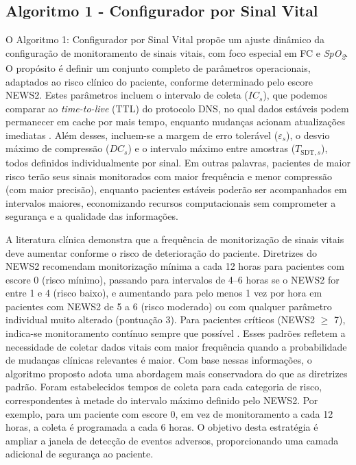 \documentclass[twoside,english,brazilian]{UNISINOSmonografia}
\begin{document}
\subsection{Algoritmo 1 - Configurador por Sinal Vital}
\label{alg1}
O Algoritmo 1: Configurador por Sinal Vital propõe um ajuste dinâmico da configuração de monitoramento de sinais vitais, com foco especial em FC e \textit{SpO\textsubscript{2}}. O propósito é definir um conjunto completo de parâmetros operacionais, adaptados ao risco clínico do paciente, conforme determinado pelo escore NEWS2. Estes parâmetros incluem o intervalo de coleta ($IC_s$), que podemos comparar ao \textit{time-to-live} (TTL) do protocolo DNS, no qual dados estáveis podem permanecer em cache por mais tempo, enquanto mudanças acionam atualizações imediatas \cite{Tanenbaum2010}.
Além desses, incluem-se a margem de erro tolerável ($\varepsilon_s$), o desvio máximo de compressão ($DC_s$) e o intervalo máximo entre amostras ($T_{\text{SDT},s}$), todos definidos individualmente por sinal. Em outras palavras, pacientes de maior risco terão seus sinais monitorados com maior frequência e menor compressão (com maior precisão), enquanto pacientes estáveis poderão ser acompanhados em intervalos maiores, economizando recursos computacionais sem comprometer a segurança e a qualidade das informações.

A literatura clínica demonstra que a frequência de monitorização de sinais vitais deve aumentar conforme o risco de deterioração do paciente. Diretrizes do NEWS2 recomendam monitorização mínima a cada 12 horas para pacientes com escore 0 (risco mínimo), passando para intervalos de 4–6 horas se o NEWS2 for entre 1 e 4 (risco baixo), e aumentando para pelo menos 1 vez por hora em pacientes com NEWS2 de 5 a 6 (risco moderado) ou com qualquer parâmetro individual muito alterado (pontuação 3). Para pacientes críticos (NEWS2 $\ge$ 7), indica-se monitoramento contínuo sempre que possível \cite{RoyalCollege2017}. Esses padrões refletem a necessidade de coletar dados vitais com maior frequência quando a probabilidade de mudanças clínicas relevantes é maior. Com base nessas informações, o algoritmo proposto adota uma abordagem mais conservadora do que as diretrizes padrão. Foram estabelecidos tempos de coleta para cada categoria de risco, correspondentes à metade do intervalo máximo definido pelo NEWS2. Por exemplo, para um paciente com escore 0, em vez de monitoramento a cada 12 horas, a coleta é programada a cada 6 horas. O objetivo desta estratégia é ampliar a janela de detecção de eventos adversos, proporcionando uma camada adicional de segurança ao paciente.
\end{document}

